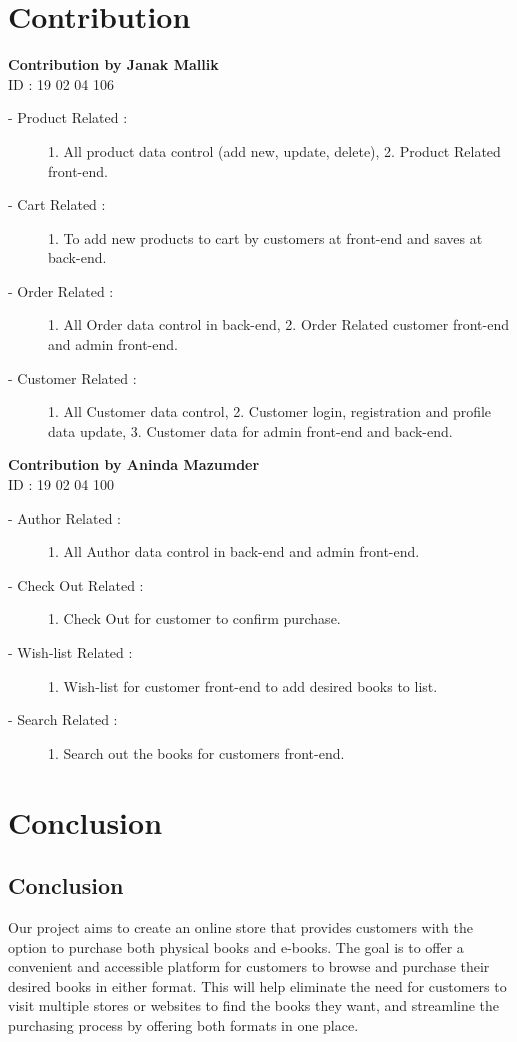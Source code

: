 \documentclass[12pt,a4paper]{article}
\begin{document}
\section{Contribution}
{\large\textbf{Contribution by Janak Mallik}}
\\ID : 19 02 04 106
\begin{description}
    \item[\hspace{7mm}- Product Related :] 1. All product data control (add new, update, delete), 2. Product Related front-end.
    \item[\hspace{7mm}- Cart Related :] 1. To add new products to cart by customers at front-end and saves at back-end.
    \item[\hspace{7mm}- Order Related :] 1. All Order data control in back-end, 2. Order Related customer front-end and admin front-end.
    \item[\hspace{7mm}- Customer Related :] 1. All Customer data control, 2. Customer login, registration and profile data update, 3. Customer data for admin front-end and back-end.
\end{description}

\vspace{5mm}
{\large\textbf{Contribution by Aninda Mazumder}}
\\ID : 19 02 04 100
\begin{description}
    \item[\hspace{7mm}- Author Related :] 1. All Author data control in back-end and admin front-end.
    \item[\hspace{7mm}- Check Out Related :] 1. Check Out for customer to confirm purchase.
    \item[\hspace{7mm}- Wish-list Related :] 1. Wish-list for customer front-end to add desired books to list.
    \item[\hspace{7mm}- Search Related :] 1. Search out the books for customers front-end.
\end{description}


\section{Conclusion}
\subsection{Conclusion}
Our project aims to create an online store that provides customers with the option to purchase both physical books and e-books. The goal is to offer a convenient and accessible platform for customers to browse and purchase their desired books in either format. This will help eliminate the need for customers to visit multiple stores or websites to find the books they want, and streamline the purchasing process by offering both formats in one place.
\end{document}
